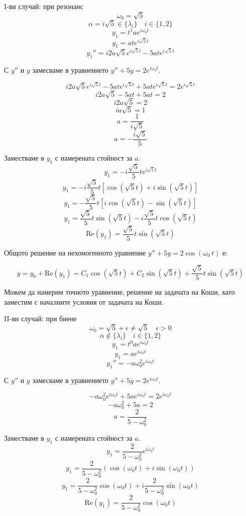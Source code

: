 \documentclass[11pt]{article}
\begin{document}
\begin{flushleft}
    {\LARGE I-ви случай: при резонанс}
    $$\omega_0 = \sqrt{5}$$
    $$\alpha = i\sqrt{5} \in \{\lambda_i\} \quad i \in \{1, 2\}$$
    $$y_1 = t^1 a e^{i \omega_0 t}$$
    $$y_1 = ate^{i\sqrt{5} t}$$
    $$y_1'' = i2a\sqrt{5}e^{i\sqrt{5}t} - 5ate^{i\sqrt{5}t}$$

    С $y''$ и $y$ замесваме в уравнението $y'' + 5y = 2 e^{i \omega_0 t}$.

    $$i2a\sqrt{5}e^{i\sqrt{5}t} - 5ate^{i\sqrt{5}t} + 5ate^{i\sqrt{5} t} = 2e^{i\sqrt{5}t}$$
    $$i2a\sqrt{5} - 5at + 5at = 2$$
    $$i2a\sqrt{5} = 2$$
    $$ia\sqrt{5} = 1$$
    $$a = \dfrac{1}{i\sqrt{5}}$$
    $$a = -\dfrac{i\sqrt{5}}{5}$$
    
    Заместваме в $y_1$ с намерената стойност за $a$. \\

    $$y_1 = -i\dfrac{\sqrt{5}}{5}te^{i\sqrt{5} t}$$
    $$y_1 = -i\dfrac{\sqrt{5}}{5}t[\cos(\sqrt{5}t) + i\sin(\sqrt{5}t)]$$
    $$y_1 = -\dfrac{\sqrt{5}}{5}t[i\cos(\sqrt{5}t) - \sin(\sqrt{5}t)]$$
    $$y_1 = \dfrac{\sqrt{5}}{5}t\sin(\sqrt{5}t) - i\dfrac{\sqrt{5}}{5}t\cos(\sqrt{5}t)$$
    $$\text{Re}(y_1) = \dfrac{\sqrt{5}}{5}t\sin(\sqrt{5}t)$$

    Общото решение на нехомогенното уравнение $y'' + 5y = 2 \cos(\omega_0 \, t)$ е:

    $$y = y_0 + \text{Re}(y_1) = C_1 \cos(\sqrt{5}t) + C_2 \sin(\sqrt{5}t) + \dfrac{\sqrt{5}}{5}t\sin(\sqrt{5}t)$$

    Можем да намерим точното уравнение, решение на задачата на Коши, като заместим с началните условия от задачата на Коши. \\
    \vspace{0.2cm}

    {\LARGE II-ви случай: при биене}
    $$\omega_0 = \sqrt{5} + \epsilon \ne \sqrt{5} \quad \epsilon > 0$$
    $$\alpha \notin \{\lambda_i\} \quad i \in \{1, 2\}$$
    $$y_1 = t^0 a e^{i \omega_0 t}$$
    $$y_1 = ae^{i\omega_0 t} $$
    $$y_1'' = -a\omega_0^2e^{i\omega_0t}$$

    С $y''$ и $y$ замесваме в уравнението $y'' + 5y = 2 e^{i \omega_0 t}$.

    $$-a\omega_0^2e^{i\omega_0t} + 5ae^{i\omega_0 t} = 2e^{i\omega_0 t}$$
    $$-a\omega_0^2 + 5a = 2$$
    $$a = \dfrac{2}{5 - \omega_0^2}$$

    Заместваме в $y_1$ с намерената стойност за $a$. \\

    $$y_1 = \dfrac{2}{5 - \omega_0^2}e^{i\omega_0 t}$$
    $$y_1 = \dfrac{2}{5 - \omega_0^2}(\cos(\omega_0 t) + i\sin(\omega_0 t))$$
    $$y_1 = \dfrac{2}{5 - \omega_0^2}\cos(\omega_0 t) + i\dfrac{2}{5 - \omega_0^2}\sin(\omega_0 t)$$
    $$\text{Re}(y_1) = \dfrac{2}{5 - \omega_0^2}\cos(\omega_0 t)$$


\end{flushleft}
\end{document}
